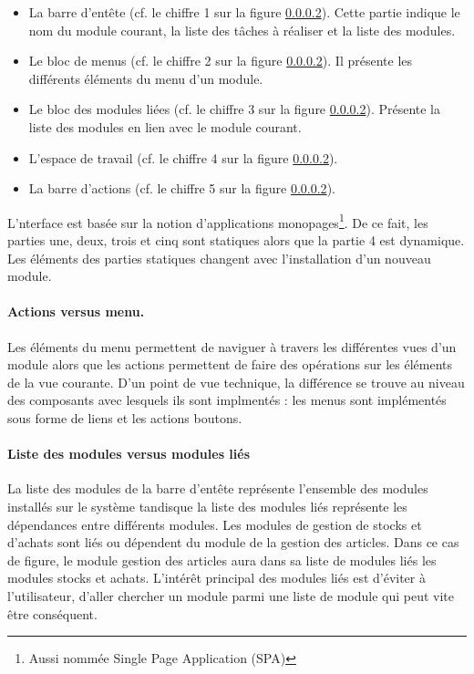 \documentclass[a4paper,11pt]{report}
\begin{document}
\begin{itemize}
\item La barre d'entête (cf. le chiffre 1 sur la figure \ref{}). Cette
  partie indique le nom du module courant, la liste des tâches à
  réaliser et la liste des modules.
\item  Le bloc de menus  (cf. le chiffre 2 sur la figure \ref{}). Il
  présente les différents éléments du menu d'un module.
\item Le bloc des modules liées  (cf. le chiffre 3 sur la figure
  \ref{}). Présente la liste des modules en lien avec le module courant.
\item  L'espace de travail  (cf. le chiffre 4 sur la figure
  \ref{}).
  
\item La barre d'actions  (cf. le chiffre 5 sur la figure \ref{}). 
 
\end{itemize}

L'nterface est basée sur la notion d'applications
monopages\footnote{Aussi nommée Single Page Application (SPA) }.
De ce fait, les parties une, deux, trois et cinq sont statiques alors
que la partie 4 est dynamique. Les éléments des parties statiques
changent avec l'installation d'un nouveau module.
   
\paragraph{Actions versus menu.}
Les éléments du menu permettent de naviguer à travers les
différentes vues d'un module alors que les actions permettent de
faire des opérations sur les éléments de la vue courante. D'un point
de vue technique, la différence se trouve au niveau des composants avec
lesquels ils sont implmentés : les menus sont implémentés   sous forme
de liens et les actions boutons. 

\paragraph{Liste des modules versus modules liés}
La liste des modules de la barre d'entête représente l'ensemble des
modules installés sur le système tandisque la liste des modules liés
représente les dépendances entre différents modules. Les modules de
gestion de stocks et d'achats sont liés ou dépendent du module de la
gestion des articles. Dans ce cas de figure, le module gestion des
articles aura dans sa liste de modules liés les modules stocks et
achats. L'intérêt principal des modules liés est d'éviter à
l'utilisateur, d'aller chercher un module parmi une liste de module
qui peut vite être conséquent.
\end{document}
